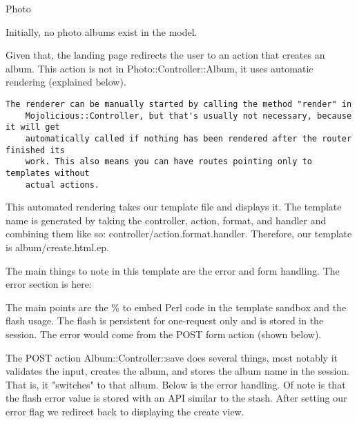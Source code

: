 \documentclass[14pt]{extreport}
\begin{document}
{\Large Photo}

Initially, no photo albums exist in the model.

Given that, the landing page redirects the user to an action that creates an
album.  This action is not in Photo::Controller::Album, it uses automatic
rendering (explained below).

\begin{lstlisting}[style=BlockStyle]
    The renderer can be manually started by calling the method "render" in
    Mojolicious::Controller, but that's usually not necessary, because it will get
    automatically called if nothing has been rendered after the router finished its
    work. This also means you can have routes pointing only to templates without
    actual actions.
\end{lstlisting}

This automated rendering takes our template file and displays it.  The template
name is generated by taking the controller, action, format, and handler and
combining them like so: controller/action.format.handler.  Therefore, our
template is album/create.html.ep.

The main things to note in this template are the error and form handling.  The
error section is here:



The main points are the \% to embed Perl code in the template sandbox and the
flash usage.  The flash is persistent for one-request only and is stored in the
session.  The error would come from the POST form action (shown below).



The POST action Album::Controller::save does several things, most notably it
validates the input, creates the album, and stores the album name in the session. 
That is, it "switches" to that album. Below is the error handling.  Of note is that
the flash error value is stored with an API similar to the stash.  After setting our
error flag we redirect back to displaying the create view.

\clearpage


\end{document}
